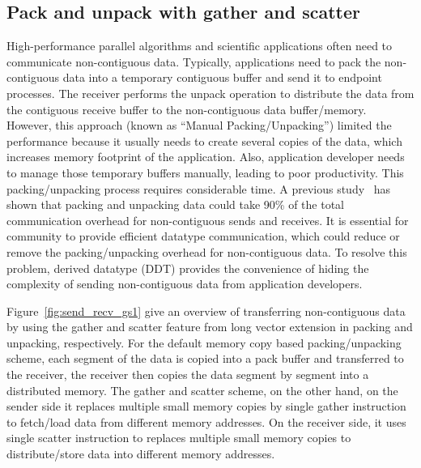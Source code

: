 \documentclass[conference]{IEEEtran}
\begin{document}
\subsection{Pack and unpack with gather and scatter}
High-performance parallel algorithms and scientific applications often
need to communicate non-contiguous data. Typically, applications need to pack
the non-contiguous data into a temporary contiguous buffer and send it to endpoint processes.
The receiver performs the unpack operation to distribute the data from the contiguous
receive buffer to the non-contiguous data buffer/memory.
However, this approach (known as ``Manual Packing/Unpacking”) limited the performance because
it usually needs to create several copies of the data, which increases memory footprint of the application.
Also, application developer needs to manage those temporary
buffers manually, leading to poor productivity. This packing/unpacking process requires considerable time.
A previous study~\cite{mpi-ddt-benchmark} has shown that packing
and unpacking data could take 90\% of the total communication
overhead for non-contiguous sends and receives.
It is essential for \mpi community to provide efficient \mpi datatype communication, which could
reduce or remove the packing/unpacking overhead for non-contiguous data.
To resolve this problem, \mpi derived datatype (DDT) provides the convenience of hiding the complexity of sending
non-contiguous data from application developers.

Figure~\ref{fig:send_recv_gs1} give an overview of \ourwork transferring non-contiguous data
by using the gather and scatter feature from long vector extension in packing and unpacking, respectively.
For the default memory copy based packing/unpacking scheme, each segment of the data is copied into a pack
buffer and transferred to the receiver, the receiver then copies the data segment by segment into a distributed memory.
The gather and scatter scheme, on the other hand, on the sender side it replaces multiple small memory
copies by single gather instruction to fetch/load data from different memory addresses.
On the receiver side, it uses single scatter instruction to replaces multiple small memory
copies to distribute/store data into different memory addresses.
\end{document}
